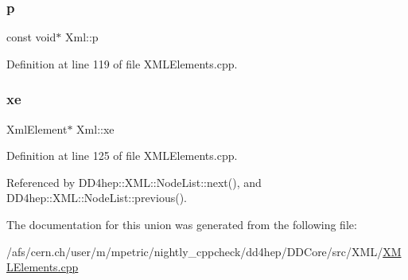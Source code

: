 \subsubsection{\texorpdfstring{p}{p}}
{\footnotesize\ttfamily const void$\ast$ Xml\+::p}



Definition at line 119 of file X\+M\+L\+Elements.\+cpp.

\hypertarget{union_xml_abd997a186caa27d85c309989aceb690f}{}\label{union_xml_abd997a186caa27d85c309989aceb690f} 
\subsubsection{\texorpdfstring{xe}{xe}}
{\footnotesize\ttfamily Xml\+Element$\ast$ Xml\+::xe}



Definition at line 125 of file X\+M\+L\+Elements.\+cpp.



Referenced by D\+D4hep\+::\+X\+M\+L\+::\+Node\+List\+::next(), and D\+D4hep\+::\+X\+M\+L\+::\+Node\+List\+::previous().



The documentation for this union was generated from the following file\+:\begin{DoxyCompactItemize}
\item 
/afs/cern.\+ch/user/m/mpetric/nightly\+\_\+cppcheck/dd4hep/\+D\+D\+Core/src/\+X\+M\+L/\hyperlink{_x_m_l_elements_8cpp}{X\+M\+L\+Elements.\+cpp}\end{DoxyCompactItemize}
